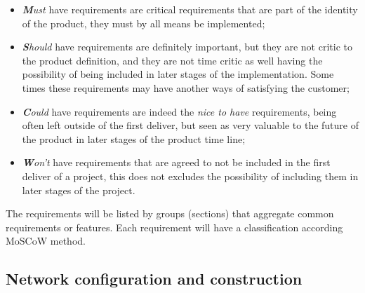 \begin{itemize}
    \item \textit{\textbf{M}ust} have requirements are critical requirements that are part of the identity of the product, they must by all means be implemented;
    \item \textit{\textbf{S}hould} have requirements are definitely important, but they are not critic to the product definition, and they are not time critic as well having the possibility of being included in later stages of the implementation. Some times these requirements may have another ways of satisfying the customer;
    \item \textit{\textbf{C}ould} have requirements are indeed the \textit{nice to have} requirements, being often left outside of the first deliver, but seen as very valuable to the future of the product in later stages of the product time line;
    \item \textit{\textbf{W}on't} have requirements that are agreed to not be included in the first deliver of a project, this does not excludes the possibility of including them in later stages of the project.
\end{itemize}

The requirements will be listed by groups (sections) that aggregate common requirements or features. Each requirement will have a classification according MoSCoW method.

\subsection{Network configuration and construction}

